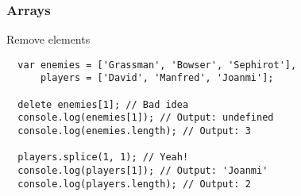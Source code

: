 \begin{frame}[fragile]
  \frametitle{Arrays}

  \begin{block}{Remove elements}
  {\scriptsize
  \begin{verbatim}
  var enemies = ['Grassman', 'Bowser', 'Sephirot'],
      players = ['David', 'Manfred', 'Joanmi'];

  delete enemies[1]; // Bad idea
  console.log(enemies[1]); // Output: undefined
  console.log(enemies.length); // Output: 3

  players.splice(1, 1); // Yeah!
  console.log(players[1]); // Output: 'Joanmi'
  console.log(players.length); // Output: 2
  \end{verbatim}
  }
  \end{block}
\end{frame}
